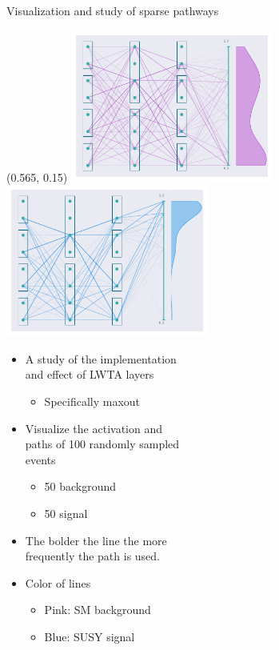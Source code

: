 \documentclass[UKenglish]{beamer}
\begin{document}
\begin{frame}{Visualization and study of sparse pathways}
    \begin{textblock}{0.8}(0.565, 0.15)
        \includegraphics[width = 0.5\textwidth]{figures/NetworkVis/AfterTrainingBkg.pdf}
        \includegraphics[width = 0.5\textwidth]{figures/NetworkVis/AfterTrainingSig.pdf}
    \end{textblock}
    \begin{itemize}
        \item A study of the implementation \\
        and effect of LWTA layers
        \begin{itemize}
            \item Specifically maxout
        \end{itemize}
        \item Visualize the activation and \\
        paths of 100 randomly sampled \\
        events
        \begin{itemize}
            \item 50 background
            \item 50 signal
        \end{itemize}
        \item The bolder the line the more\\ 
        frequently the path is used.
        \item Color of lines 
        \begin{itemize}
            \item Pink: SM background
            \item Blue: SUSY signal
        \end{itemize}
    \end{itemize}
\end{frame}
\end{document}
